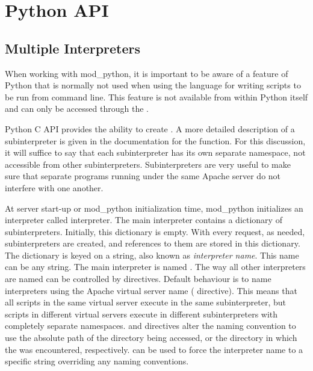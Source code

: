 
\chapter{Python API\label{pythonapi}}

\section{Multiple Interpreters\label{pyapi-interps}}
      
When working with mod_python, it is important to be aware of a feature
of Python that is normally not used when using the language for
writing scripts to be run from command line. This feature is not
available from within Python itself and can only be accessed through
the .

Python C API provides the ability to create . A
more detailed description of a subinterpreter is given in the
documentation for the
function. For this discussion, it will suffice to say that each
subinterpreter has its own separate namespace, not accessible from
other subinterpreters. Subinterpreters are very useful to make sure
that separate programs running under the same Apache server do not
interfere with one another.

At server start-up or mod_python initialization time, mod_python
initializes an interpreter called  interpreter.  The main
interpreter contains a dictionary of subinterpreters. Initially, this
dictionary is empty. With every request, as needed, subinterpreters
are created, and references to them are stored in this dictionary. The
dictionary is keyed on a string, also known as \emph{interpreter
name}. This name can be any string.  The main interpreter is named
.  The way all other interpreters are named can
be controlled by  directives. Default behaviour is
to name interpreters using the Apache virtual server name
( directive). This means that all scripts in the same
virtual server execute in the same subinterpreter, but scripts in
different virtual servers execute in different subinterpreters with
completely separate namespaces.
 and
directives alter the naming convention to use the absolute path of the
directory being accessed, or the directory in which the
 was encountered, respectively.
 can be used to
force the interpreter name to a specific string overriding any naming
conventions.

